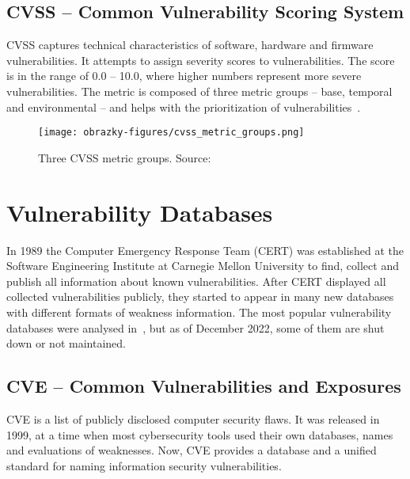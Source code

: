   \subsection*{CVSS -- Common Vulnerability Scoring System}
  CVSS captures technical characteristics of software, hardware and firmware vulnerabilities. It attempts
  to assign severity scores to vulnerabilities. The score is in the range of 0.0 -- 10.0, where higher numbers represent
  more severe vulnerabilities. The metric is composed of three metric groups -- base, temporal and environmental --
  and helps with the prioritization of vulnerabilities~\cite{CVSSFirst, CVSSresearchgate}.

  \begin{figure}[h]
    \centering
    \texttt{[image: obrazky-figures/cvss\_metric\_groups.png]}
    \caption{Three CVSS metric groups. Source:~\cite{CVSSFirst}}
  \end{figure}


  \section{Vulnerability Databases}
  In 1989 the Computer Emergency Response Team (CERT) was established at the Software Engineering Institute
  at Carnegie Mellon University to find, collect and publish all information about known vulnerabilities.
  After CERT displayed all collected vulnerabilities publicly, they started to appear in many new databases
  with different formats of weakness information. The most popular vulnerability databases were analysed
  in~\cite{VulnDBs}, but as of December 2022, some of them are shut down or not maintained.

  \subsection*{CVE -- Common Vulnerabilities and Exposures}
    CVE is a list of publicly disclosed computer security flaws. It was released in 1999, at a time when
    most cybersecurity tools used their own databases, names and evaluations of weaknesses. Now, CVE provides
    a database and a unified standard for naming information security vulnerabilities.

